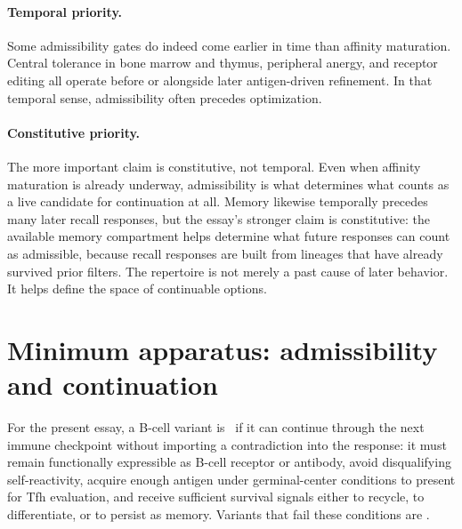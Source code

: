 \documentclass[11pt]{article}
\begin{document}
\paragraph{Temporal priority.}
Some admissibility gates do indeed come earlier in time than affinity maturation. Central tolerance in bone marrow and thymus, peripheral anergy, and receptor editing all operate before or alongside later antigen-driven refinement. In that temporal sense, admissibility often precedes optimization.

\paragraph{Constitutive priority.}
The more important claim is constitutive, not temporal. Even when affinity maturation is already underway, admissibility is what determines what counts as a live candidate for continuation at all. Memory likewise temporally precedes many later recall responses, but the essay's stronger claim is constitutive: the available memory compartment helps determine what future responses can count as admissible, because recall responses are built from lineages that have already survived prior filters. The repertoire is not merely a past cause of later behavior. It helps define the space of continuable options.

\section{Minimum apparatus: admissibility and continuation}
\begin{definition}
For the present essay, a B-cell variant is \admissible\ if it can continue through the next immune checkpoint without importing a contradiction into the response: it must remain functionally expressible as B-cell receptor or antibody, avoid disqualifying self-reactivity, acquire enough antigen under germinal-center conditions to present for Tfh evaluation, and receive sufficient survival signals either to recycle, to differentiate, or to persist as memory. Variants that fail these conditions are \inadmissible.
\end{definition}
\end{document}
